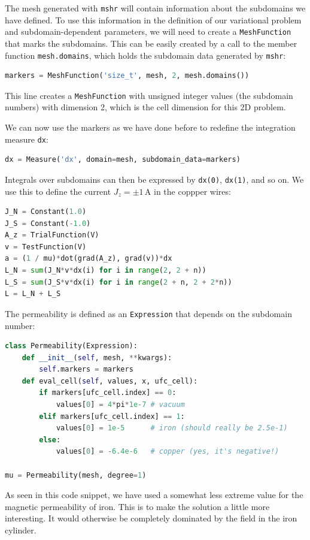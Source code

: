 \documentclass[graybox,envcountchap,sectrefs,final]{svmonodo}
\begin{document}
The mesh generated with \texttt{mshr} will contain information about the
subdomains we have defined. To use this information in the definition of
our variational problem and subdomain-dependent parameters, we will need to
create a \texttt{MeshFunction} that marks the subdomains. This can be easily
created by a call to the member function \texttt{mesh.domains}, which holds
the subdomain data generated by \texttt{mshr}:

\begin{lstlisting}[language=Python,style=graycolor]
markers = MeshFunction('size_t', mesh, 2, mesh.domains())
\end{lstlisting}
This line creates a \texttt{MeshFunction} with unsigned integer values (the
subdomain numbers) with dimension 2, which is the cell dimension for
this 2D problem.

We can now use the markers as we have done before to redefine the
integration measure \texttt{dx}:


\begin{lstlisting}[language=Python,style=graycolor]
dx = Measure('dx', domain=mesh, subdomain_data=markers)
\end{lstlisting}
Integrals over subdomains can then be expressed by \texttt{dx(0)}, \texttt{dx(1)},
and so on. We use this to define the current $J_z = \pm 1\,\mathrm{A}$
in the coppper wires:

\begin{lstlisting}[language=Python,style=graycolor]
J_N = Constant(1.0)
J_S = Constant(-1.0)
A_z = TrialFunction(V)
v = TestFunction(V)
a = (1 / mu)*dot(grad(A_z), grad(v))*dx
L_N = sum(J_N*v*dx(i) for i in range(2, 2 + n))
L_S = sum(J_S*v*dx(i) for i in range(2 + n, 2 + 2*n))
L = L_N + L_S
\end{lstlisting}

The permeability is defined as an \texttt{Expression} that depends on the
subdomain number:
\begin{lstlisting}[language=Python,style=graycolor]
class Permeability(Expression):
    def __init__(self, mesh, **kwargs):
        self.markers = markers
    def eval_cell(self, values, x, ufc_cell):
        if markers[ufc_cell.index] == 0:
            values[0] = 4*pi*1e-7 # vacuum
        elif markers[ufc_cell.index] == 1:
            values[0] = 1e-5      # iron (should really be 2.5e-1)
        else:
            values[0] = -6.4e-6   # copper (yes, it's negative!)

mu = Permeability(mesh, degree=1)
\end{lstlisting}
As seen in this code snippet, we have used a somewhat less extreme
value for the magnetic permeability of iron. This is to make the
solution a little more interesting. It would otherwise be completely
dominated by the field in the iron cylinder.
\end{document}
